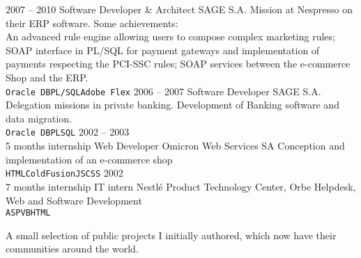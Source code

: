 \documentclass[9pt]{developercv} %
\begin{document}
\begin{entrylist}
	\entry
		{2007 -- 2010}
		{Software Developer \& Architect}
		{SAGE S.A.}
		{Mission at Nespresso on their ERP software. Some achievements:\\
      An advanced rule engine allowing users to compose complex
      marketing rules; SOAP interface in PL/SQL for payment gateways and
      implementation of payments respecting the PCI-SSC rules; SOAP services
      between the e-commerce Shop and the ERP. \\
      \texttt{Oracle DB}\slashsep\texttt{PL/SQL}\slashsep\texttt{Adobe Flex}}
	\entry
		{2006 -- 2007}
		{Software Developer}
		{SAGE S.A.}
		{Delegation missions in private banking. Development of Banking software and
      data migration.\\
      \texttt{Oracle DB}\slashsep\texttt{PLSQL}}
	\entry
		{2002 -- 2003\\\footnotesize{5 months internship}}
		{Web Developer}
		{Omicron Web Services SA}
		{Conception and implementation of an e-commerce shop \\
      \texttt{HTML}\slashsep\texttt{ColdFusion}\slashsep\texttt{JS}\slashsep\texttt{CSS}}
	\entry
		{2002\\\footnotesize{7 months internship}}
		{IT intern}
		{Nestlé Product Technology Center, Orbe}
		{Helpdesk, Web and Software Development \\
      \texttt{ASP}\slashsep\texttt{VB}\slashsep\texttt{HTML}}
\end{entrylist}



{A small selection of public projects I initially authored, which now have their
  communities around the world.}\\
\end{document}
